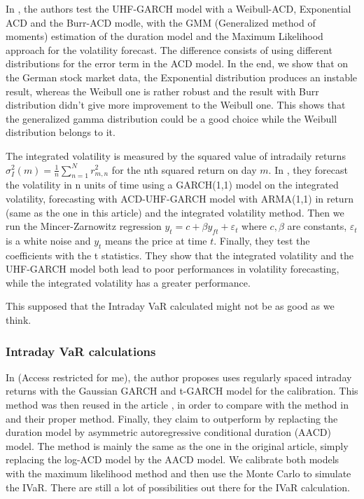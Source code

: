 \documentclass[12pt, a4paper]{article}
\begin{document}
In \cite{forecasting}, the authors test the UHF-GARCH model with a Weibull-ACD, Exponential ACD and the Burr-ACD modle, with the GMM (Generalized method of moments) estimation of the duration model and the Maximum Likelihood approach for the volatility forecast. The difference consists of using different distributions for the error term in the ACD model. In the end, we show that on the German stock market data, the Exponential distribution produces an instable result, whereas the Weibull one is rather robust and the result with Burr distribution didn't give more improvement to the Weibull one. This shows that the generalized gamma distribution could be a good choice while the Weibull distribution belongs to it.

The integrated volatility is measured by the squared value of intradaily returns $\sigma^2_I(m) = \frac{1}{n}\sum^N_{n=1} r^2_{m,n}$ for the nth squared return on day $m$. In \cite{vol}, they forecast the volatility in n units of time using a GARCH(1,1) model on the integrated volatility, forecasting with ACD-UHF-GARCH model with ARMA(1,1) in return (same as the one in this article) and the integrated volatility method. Then we run the Mincer-Zarnowitz regression $y_t = c + \beta y_{ft} + \varepsilon_t$ where $c, \beta$ are constants, $\varepsilon_t$ is a white noise and $y_t$ means the price at time $t$. Finally, they test the coefficients with the t statistics.  They show that the integrated volatility and the UHF-GARCH model both lead to poor performances in volatility forecasting, while the integrated volatility has a greater performance.

This supposed that the Intraday VaR calculated might not be as good as we think.


\subsubsection{Intraday VaR calculations}
In \cite{Giot} (Access restricted for me), the author proposes uses regularly spaced intraday returns with the Gaussian GARCH and t-GARCH model for the calibration. This method was then reused in the article \cite{asym-ACD}, in order to compare with the method in \cite{Toronto} and their proper method. Finally, they claim to outperform \cite{Toronto} by replacting the duration model by asymmetric autoregressive conditional duration (AACD) model. The method is mainly the same as the one in the original article, simply replacing the log-ACD model by the AACD model. We calibrate both models with the maximum likelihood method and then use the Monte Carlo to simulate the IVaR. There are still a lot of possibilities out there for the IVaR calculation.
\end{document}
